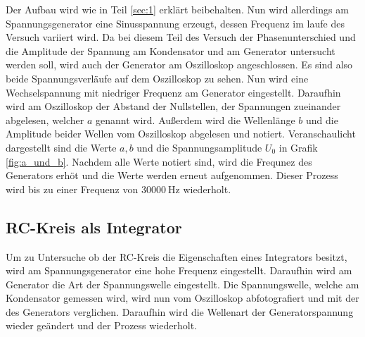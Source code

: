 Der Aufbau wird wie in Teil \ref{sec:1} erklärt beibehalten.
Nun wird allerdings am Spannungsgenerator eine Sinusspannung erzeugt, dessen Frequenz im laufe des Versuch variiert wird.
Da bei diesem Teil des Versuch der Phasenunterschied und die Amplitude der Spannung am Kondensator und am Generator untersucht werden soll, wird auch der Generator am Oszilloskop angeschlossen.
Es sind also beide Spannungsverläufe auf dem Oszilloskop zu sehen.
Nun wird eine Wechselspannung mit niedriger Frequenz am Generator eingestellt.
Daraufhin wird am Oszilloskop der Abstand der Nullstellen, der Spannungen zueinander abgelesen, welcher $a$ genannt wird.
Außerdem wird die Wellenlänge $b$ und die Amplitude beider Wellen vom Oszilloskop abgelesen und notiert.
Veranschaulicht dargestellt sind die Werte $a, b$ und die Spannungsamplitude $U_0$ in Grafik \ref{fig:a_und_b}.
Nachdem alle Werte notiert sind, wird die Frequnez des Generators erhöt und die Werte werden erneut aufgenommen.
Dieser Prozess wird bis zu einer Frequenz von $\SI{30000}{\hertz}$ wiederholt.


\subsection{RC-Kreis als Integrator}

Um zu Untersuche ob der RC-Kreis die Eigenschaften eines Integrators besitzt, wird am Spannungsgenerator eine hohe Frequenz eingestellt.
Daraufhin wird am Generator die Art der Spannungswelle eingestellt.
Die Spannungswelle, welche am Kondensator gemessen wird, wird nun vom Oszilloskop abfotografiert und mit der des Generators verglichen.
Daraufhin wird die Wellenart der Generatorspannung wieder geändert und der Prozess wiederholt.
